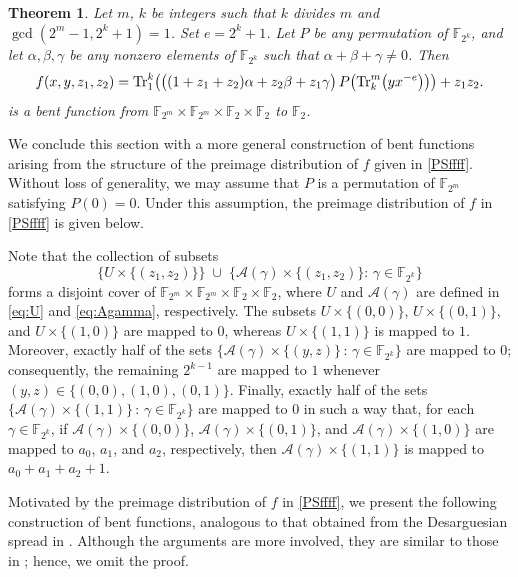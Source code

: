 \documentclass[12pt]{article}
\theoremstyle{plain}
\newtheorem{theorem}{Theorem}
\theoremstyle{definition}
\newcommand{\F}{\mathbb{F}}
\newcommand{\Tr}{{\rm Tr}}
\begin{document}
	\begin{theorem}
		Let $m$, $k$ be integers such that $k$ divides $m$ and $\gcd(2^m-1, 2^k+1) = 1$. Set
		$e =2^k+1$.
		Let $P$ be any permutation of $\F_{2^k}$, 
		and let $\alpha,\beta,\gamma$ be any nonzero elements of $\F_{2^k}$ such that $\alpha + \beta + \gamma \ne 0$. Then 
		\begin{equation}
			\label{PSffff}
			f(x,y,z_1,z_2)
			= \Tr_1^k \!\left(
			\bigl((1+z_1+z_2)\alpha + z_2\beta + z_1\gamma\bigr)
			\, P\!\left(\Tr_k^m\!\left(yx^{-e}\right)\right)
			\right)
			+ z_1 z_2.
		\end{equation}
		is a bent function from $\F_{2^m}\times\F_{2^m}\times\F_2\times\F_2$ to $\F_2$.
	\end{theorem}
	
	We conclude this section with a more general construction of bent
	functions arising from the structure of the preimage distribution of
	$f$ given in \eqref{PSffff}. Without loss of generality, we may assume
	that $P$ is a permutation of $\F_{2^m}$ satisfying $P(0)=0$. Under this
	assumption, the preimage distribution of $f$ in \eqref{PSffff} is given below.
	
	Note that the collection of subsets
	\[
	\bigl\{
	U \times \{(z_1,z_2)\}
	\bigr\}
	\;\cup\;
	\bigl\{
	\mathcal A(\gamma) \times \{(z_1,z_2)\}
	:\, \gamma \in \F_{2^k}
	\bigr\}
	\]
	forms a disjoint cover of $\F_{2^m} \times \F_{2^m} \times \F_2 \times \F_2$,
	where $U$ and $\mathcal A(\gamma)$ are defined in \eqref{eq:U} and \eqref{eq:Agamma}, respectively.
	The subsets $U\times\{(0,0)\}$, $U\times\{(0,1)\}$, and 
	$U\times\{(1,0)\}$ are mapped to $0$, whereas 
	$U\times\{(1,1)\}$ is mapped to $1$. 
	Moreover, exactly half of the sets 
	$\{\mathcal{A}(\gamma)\times\{(y,z)\} \,:\, \gamma \in \F_{2^k}\}$ 
	are mapped to $0$; consequently, the remaining $2^{k-1}$ are mapped to $1$ whenever $(y,z)\in\{(0,0),(1,0),(0,1)\}$. 
	Finally, exactly half of the sets 
	$\{\mathcal{A}(\gamma)\times\{(1,1)\} \,:\, \gamma \in \F_{2^k}\}$ 
	are mapped to $0$ in such a way that, for each $\gamma \in \F_{2^k}$, if 
	$\mathcal{A}(\gamma)\times\{(0,0)\}$, 
	$\mathcal{A}(\gamma)\times\{(0,1)\}$, and 
	$\mathcal{A}(\gamma)\times\{(1,0)\}$ 
	are mapped to $a_0$, $a_1$, and $a_2$, respectively, then 
	$\mathcal{A}(\gamma)\times\{(1,1)\}$ is mapped to 
	$a_0 + a_1 + a_2 + 1$.
	
	Motivated by the preimage distribution of $f$ in \eqref{PSffff}, we present the following construction of bent functions, analogous to that obtained from the Desarguesian spread in \cite{akkmpp26}. Although the arguments are more involved, they are similar to those in \cite{akkmpp26}; hence, we omit the proof.
	
\end{document}
